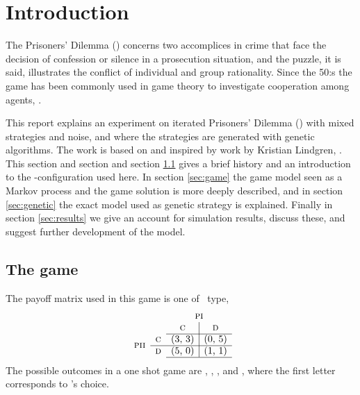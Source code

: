 \section{Introduction}\label{sec:intro}
The Prisoners' Dilemma (\pd) concerns two accomplices in crime that face the decision of confession or silence in a prosecution situation, and the puzzle, it is said, illustrates the conflict of individual and group rationality. Since the 50:s the game has been commonly used in game theory to investigate cooperation among agents, \cite{stanford:pd}.\mypar

This report explains an experiment on iterated Prisoners' Dilemma (\ipd) with mixed strategies and noise, and where the strategies are generated with genetic algorithms. The work is based on and inspired by work by Kristian Lindgren, \cite{lindgren:1991}. This section and section and section \ref{sec:intro:game} gives a brief history and an introduction to the \pd-configuration used here. In section \ref{sec:game} the game model seen as a Markov process and the game solution is more deeply described, and in section \ref{sec:genetic} the exact model used as genetic strategy is explained. Finally in section \ref{sec:results} we give an account for simulation results, discuss these, and suggest further development of the model.

\subsection{The game}\label{sec:intro:game}
The payoff matrix used in this game is one of \pd\ type,
\begin{equation}
\begin{array}{cc c|c}
		     &            & \multicolumn{2}{c}{\pone} \\
		     &            & \textsc{c} & \textsc{d}   \\ \cline{3-4}
\multirow{2}*{\ptwo} & \textsc{c} & $(3, 3)$   & $(0, 5)$     \\ \cline{2-4}
		     & \textsc{d} & $(5, 0)$   & $(1, 1)$     \\ \cline{3-4}
\end{array}
\label{equ:intro:payoff}
\end{equation}
The possible outcomes in a one shot game are , , , and , where the first letter corresponds to \pone's choice.\mypar

